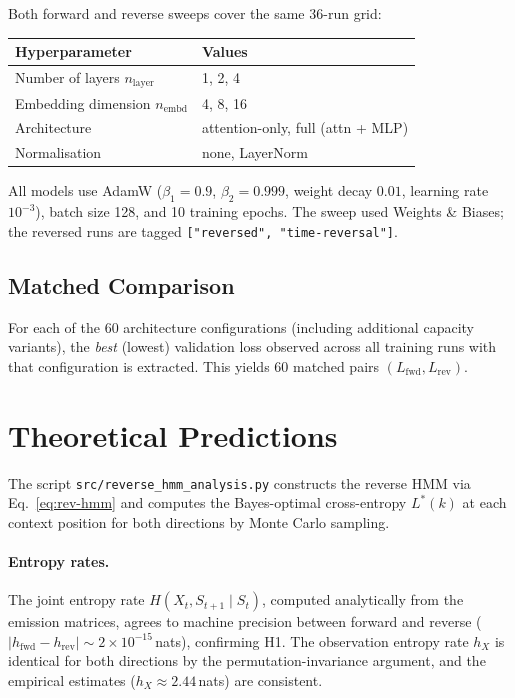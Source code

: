 \documentclass[11pt]{article}
\begin{document}
Both forward and reverse sweeps cover the same $36$-run grid:
\begin{center}
  \begin{tabular}{ll}
    \toprule
    Hyperparameter & Values \\
    \midrule
    Number of layers $n_{\mathrm{layer}}$ & 1, 2, 4 \\
    Embedding dimension $n_{\mathrm{embd}}$ & 4, 8, 16 \\
    Architecture & attention-only, full (attn + MLP) \\
    Normalisation & none, LayerNorm \\
    \bottomrule
  \end{tabular}
\end{center}
All models use AdamW ($\beta_1 = 0.9$, $\beta_2 = 0.999$, weight decay $0.01$, learning rate $10^{-3}$), batch size 128, and 10 training epochs.  The sweep used Weights \& Biases; the reversed runs are tagged \texttt{["reversed", "time-reversal"]}.

\subsection{Matched Comparison}

For each of the $60$ architecture configurations (including additional capacity variants), the \emph{best} (lowest) validation loss observed across all training runs with that configuration is extracted.  This yields 60 matched pairs $(L_{\mathrm{fwd}}, L_{\mathrm{rev}})$.

\section{Theoretical Predictions}\label{sec:theory}

The script \texttt{src/reverse\_hmm\_analysis.py} constructs the reverse HMM via Eq.~\eqref{eq:rev-hmm} and computes the Bayes-optimal cross-entropy $L^{*}(k)$ at each context position for both directions by Monte Carlo sampling.

\paragraph{Entropy rates.}
The joint entropy rate $H(X_t, S_{t+1} \mid S_t)$, computed analytically from the emission matrices, agrees to machine precision between forward and reverse ($|h_{\mathrm{fwd}} - h_{\mathrm{rev}}| \sim 2\times10^{-15}$\,nats), confirming H1.  The observation entropy rate $h_X$ is identical for both directions by the permutation-invariance argument, and the empirical estimates ($h_X \approx 2.44$\,nats) are consistent.
\end{document}
